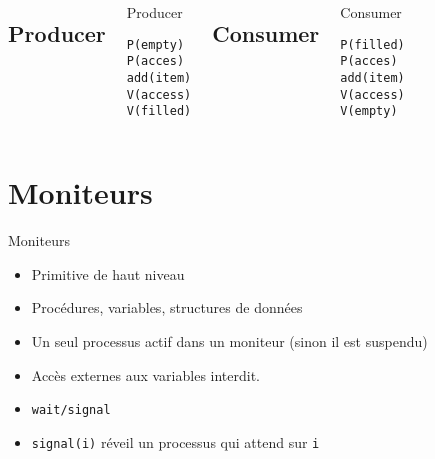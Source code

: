\section{\sectitle}
\begin{frame}[containsverbatim]{\sectitle}
\begin{columns}[t]

\def\subsectitle{Producer}
\subsection{\subsectitle}
\begin{exampleblock}{\subsectitle}
\begin{verbatim}
P(empty)
P(acces)
add(item)
V(access)
V(filled)
\end{verbatim}
\end{exampleblock}

\def\subsectitle{Consumer}
\subsection{\subsectitle}
\begin{exampleblock}{\subsectitle}
\begin{verbatim}
P(filled)
P(acces)
add(item)
V(access)
V(empty)
\end{verbatim}
\end{exampleblock}
\end{columns}
\end{frame}

\def\sectitle{Moniteurs}
\section{\sectitle}
\begin{frame}{\sectitle}
\begin{block}{\subsectitle}
\begin{itemize}
\item Primitive de haut niveau
\item Procédures, variables, structures de données
\item Un seul processus actif dans un moniteur (sinon il est suspendu)
\item Accès externes aux variables interdit.
\item \texttt{wait/signal}
\end{itemize}
\end{block}

\begin{block}{\subsectitle}
\begin{itemize}
\item \texttt{signal(i)} réveil un processus qui attend sur \texttt{i}
\end{itemize}
\end{block}
\end{frame}


